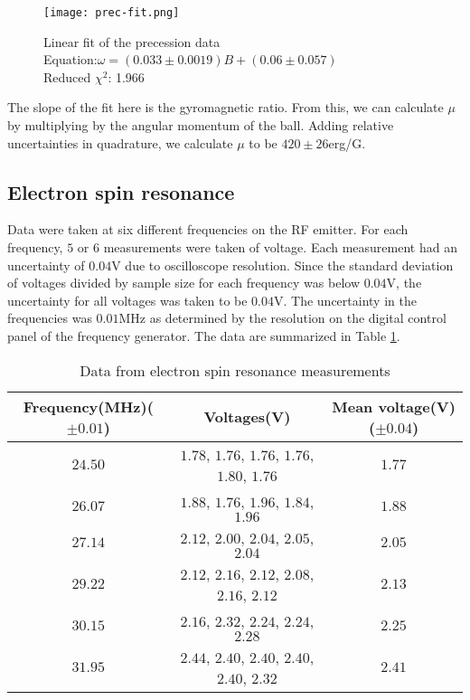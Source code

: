 \documentclass{amsart}
\numberwithin{equation}{section}
\begin{document}
\begin{figure}
\centering
\texttt{[image: prec-fit.png]}
\caption{Linear fit of the precession data\\Equation:$\omega=(0.033\pm0.0019)B+(0.06\pm0.057)$\\Reduced $\chi^2$: 1.966}
\label{precfit}
\end{figure}

The slope of the fit here is the gyromagnetic ratio. From this, we can calculate $\mu$ by multiplying by the angular momentum of the ball. Adding relative uncertainties in quadrature, we calculate $\mu$ to be $420\pm26$erg/G. 

\subsection{Electron spin resonance}
Data were taken at six different frequencies on the RF emitter. For each frequency, $5$ or $6$ measurements were taken of voltage. Each measurement had an uncertainty of $0.04$V due to oscilloscope resolution. Since the standard deviation of voltages divided by sample size for each frequency was below $0.04$V, the uncertainty for all voltages was taken to be $0.04$V. The uncertainty in the frequencies was $0.01$MHz as determined by the resolution on the digital control panel of the frequency generator. The data are summarized in Table \ref{elecdat}.

\begin{table}
\caption{Data from electron spin resonance measurements}
\label{elecdat}
\begin{tabular}[t]{|c|c|c|}
\hline
Frequency(MHz)($\pm0.01$) & Voltages(V) & Mean voltage(V)($\pm0.04$)\\
\hline
$24.50$ &  $1.78$,  $1.76$,  $1.76$,  $1.76$,  $1.80$, $1.76$ & $1.77$\\
$26.07$ &  $1.88$,  $1.76$,  $1.96$,  $1.84$,  $1.96$ & $1.88$\\
$27.14$ &  $2.12$,  $2.00$,  $2.04$,  $2.05$,  $2.04$ & $2.05$\\
$29.22$ &  $2.12$,  $2.16$,  $2.12$,  $2.08$,  $2.16$, $2.12$ & $2.13$\\
$30.15$ &  $2.16$,  $2.32$,  $2.24$,  $2.24$,  $2.28$ & $2.25$\\
$31.95$ &  $2.44$,  $2.40$,  $2.40$,  $2.40$,  $2.40$, $2.32$ & $2.41$\\
\hline
\end{tabular}
\end{table}
\end{document}
